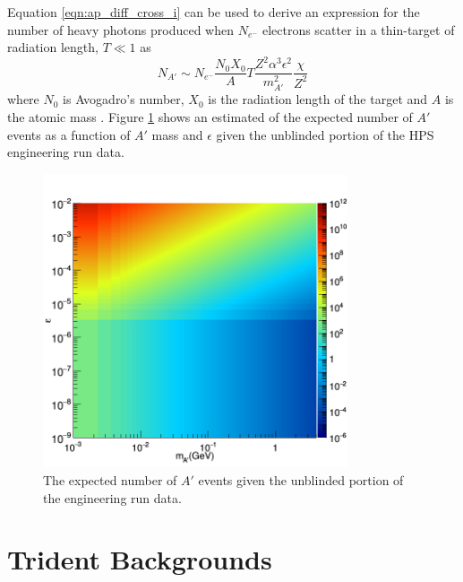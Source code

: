 Equation \ref{eqn:ap_diff_cross_i} can be used to derive an expression for the
number of heavy photons produced when $N_{e^-}$ electrons scatter in a
thin-target of radiation length, $T \ll 1$ as  
\begin{equation}
        N_{A'} \sim N_{e^-}\frac{N_0X_0}{A}T\frac{Z^2\alpha^3\epsilon^2}{m_{A'}^2}\frac{\chi}{Z^2}
\end{equation}
where $N_0$ is Avogadro's number, $X_0$ is the radiation length of the target
and $A$ is the atomic mass \cite{Bjorken:2009mm}.  Figure \ref{fig:ap_rate} shows
an estimated of the expected number of $A'$ events as a function of $A'$ mass 
and $\epsilon$ given the unblinded portion of the HPS engineering run data.
\begin{figure}[t]
    \centering
    \includegraphics[width=0.8\textwidth]{images/20160517_rate.png}
    \caption{The expected number of $A'$ events given the unblinded portion of
             the engineering run data.}
    \label{fig:ap_rate}
\end{figure}  

\section{Trident Backgrounds}

